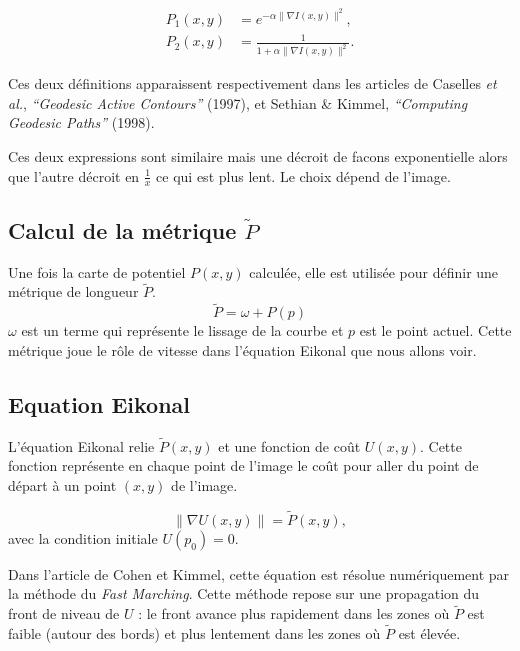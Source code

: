 \documentclass{article}
\begin{document}
\begin{equation}
\begin{aligned}
P_1(x,y) &= e^{-\alpha \|\nabla I(x,y)\|^2}, \\
P_2(x,y) &= \frac{1}{1 + \alpha \|\nabla I(x,y)\|^2}.
\end{aligned}
\end{equation}

Ces deux définitions apparaissent respectivement dans les articles de  
Caselles \textit{et al.}, \textit{“Geodesic Active Contours”} (1997), et  
Sethian \& Kimmel, \textit{“Computing Geodesic Paths”} (1998).

Ces deux expressions sont similaire mais une décroit de facons exponentielle 
alors que l'autre décroit en $\frac{1}{x}$ ce qui est plus lent. Le choix
dépend de l'image. 

\subsection{Calcul de la métrique $\tilde{P}$}



Une fois la carte de potentiel $P(x,y)$ calculée, elle est utilisée pour définir 
une métrique de longueur $\tilde{P}$. 
\begin{equation}
\tilde{P} = \omega + P(p)
\end{equation}
$\omega$ est un terme qui représente le lissage de la courbe et $p$ est le point 
actuel. Cette métrique joue le rôle de vitesse dans l'équation Eikonal que nous 
allons voir. 



\subsection{Equation Eikonal}



L'équation Eikonal relie $\tilde{P}(x,y)$ et une fonction de coût $U(x,y)$. Cette 
fonction représente en chaque point de l'image le coût pour aller du point de départ 
à un point $(x,y)$ de l'image.

\begin{equation}
\|\nabla U(x,y)\| = \tilde{P}(x,y),
\end{equation}
avec la condition initiale $U(p_0)=0$.

Dans l'article de Cohen et Kimmel, cette équation est résolue numériquement
par la méthode du \textit{Fast Marching}.
Cette méthode repose sur une propagation du front de niveau de $U$ :
le front avance plus rapidement dans les zones où $\tilde{P}$ est faible (autour des bords)
et plus lentement dans les zones où $\tilde{P}$ est élevée.
\end{document}
